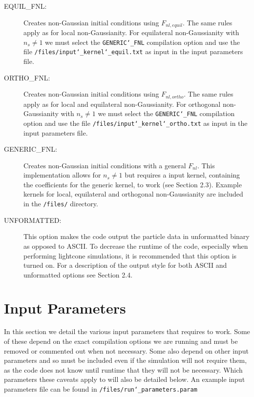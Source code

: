 \documentclass[12pt,twoside,a4paper]{article}
\begin{document}
\begin{description}
\item[EQUIL\_FNL:]{Creates non-Gaussian initial conditions using $F_{nl,equil}$. The same rules apply as for local non-Gaussianity. For equilateral non-Gaussianity with $n_{s} \neq 1$ we must select the \texttt{GENERIC\char`_FNL} compilation option and use the file \texttt{/files/input\char`_kernel\char`_equil.txt} as input in the input parameters file.}

\item[ORTHO\_FNL:]{Creates non-Gaussian initial conditions using $F_{nl,ortho}$. The same rules apply as for local and equilateral non-Gaussianity. For orthogonal non-Gaussianity with $n_{s} \neq 1$ we must select the \texttt{GENERIC\char`_FNL} compilation option and use the file \texttt{/files/input\char`_kernel\char`_ortho.txt} as input in the input parameters file.}

\item[GENERIC\_FNL:]{Creates non-Gaussian initial conditions with a general $F_{nl}$. This implementation allows for $n_{s} \neq 1$ but requires a input kernel, containing the coefficients for the generic kernel, to work (see Section 2.3). Example kernels for local, equilateral and orthogonal non-Gaussianity are included in the \texttt{/files/} directory.}

\item[UNFORMATTED:]{This option makes the code output the particle data in unformatted binary as opposed to ASCII. To decrease the runtime of the code, especially when performing lightcone simulations, it is recommended that this option is turned on. For a description of the output style for both ASCII and unformatted options see Section 2.4.}

\end{description}

\section{Input Parameters}
In this section we detail the various input parameters that {\PICOLA} requires to work. Some of these depend on the exact compilation options we are running and must be removed or commented out when not necessary. Some also depend on other input parameters and so must be included even if the simulation will not require them, as the code does not know until runtime that they will not be necessary. Which parameters these caveats apply to will also be detailed below. An example input parameters file can be found in \texttt{/files/run\char`_parameters.param}
\end{document}
